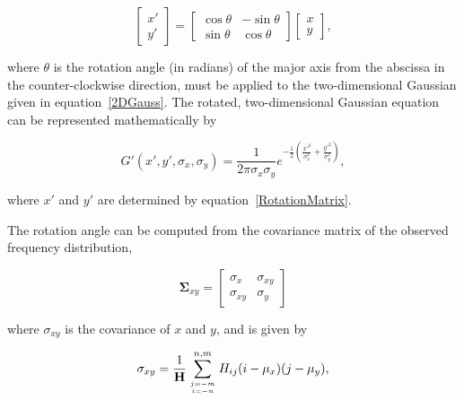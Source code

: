     \begin{equation}
        \label{RotationMatrix}
        \begin{bmatrix}
            x' \\ y'
        \end{bmatrix}
        =
        \begin{bmatrix}
            \cos{\theta} & -\sin{\theta} \\
            \sin{\theta} & \cos{\theta}
        \end{bmatrix}
        \begin{bmatrix}
            x \\ y
        \end{bmatrix},
    \end{equation}

\noindent where $\theta$ is the rotation angle (in radians) of the major axis from the abscissa in the counter-clockwise direction, must be applied to the two-dimensional Gaussian given in \mbox{equation \ref{2DGauss}}. The rotated, two-dimensional Gaussian equation can be represented mathematically by

    \begin{equation}
        \label{2DRotatedGauss}
        G'(x', y', \sigma_x, \sigma_y) = \frac{1}{2 \pi \sigma_x \sigma_y} e^{- \frac{1}{2} \left( \frac{x'^2}{\sigma_x^2} + \frac{y'^2}{\sigma_y^2} \right)},
    \end{equation}

\noindent where $x'$ and $y'$ are determined by \mbox{equation \ref{RotationMatrix}}.

The rotation angle can be computed from the covariance matrix of the observed frequency distribution,

    \begin{equation}
        \label{CovMatrix}
        \boldsymbol{\Sigma}_{xy} =
        \begin{bmatrix}
            \sigma_x & \sigma_{xy} \\
            \sigma_{xy} & \sigma_y
        \end{bmatrix}
    \end{equation}

\noindent where $\sigma_{xy}$ is the covariance of $x$ and $y$, and is given by

    \begin{equation}
        \label{sigmaxy}
        \sigma_{xy} = \frac{1}{\mathbf{H}} \sum\limits_{j=-m \atop i=-n}^{n,m}H_{ij}(i - \mu_x)(j - \mu_y),
    \end{equation}

